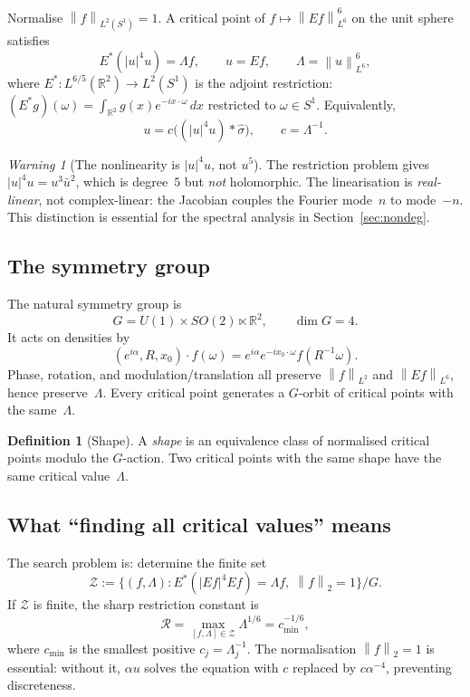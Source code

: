 \documentclass[12pt]{article}
\theoremstyle{definition}
\newtheorem{definition}[theorem]{Definition}
\theoremstyle{remark}
\newtheorem{warning}[theorem]{Warning}
\newcommand{\R}{\mathbb{R}}
\newcommand{\wh}{\widehat}
\newcommand{\norm}[1]{\left\|#1\right\|}
\begin{document}
Normalise $\norm{f}_{L^2(S^1)}=1$.  A critical point of
$f\mapsto\norm{Ef}_{L^6}^6$ on the unit sphere satisfies
\begin{equation}  \label{eq:EL}
  E^*(|u|^4u) = \Lambda f,
  \qquad u=Ef,\qquad \Lambda=\norm{u}_{L^6}^6,
\end{equation}
where $E^*:L^{6/5}(\R^2)\to L^2(S^1)$ is the adjoint restriction:
$(E^*g)(\omega)=\int_{\R^2}g(x)e^{-ix\cdot\omega}\,dx$ restricted to
$\omega\in S^1$.  Equivalently,
\begin{equation}  \label{eq:EL-u}
  u = c\bigl((|u|^4u)\ast\wh\sigma\bigr),
  \qquad c=\Lambda^{-1}.
\end{equation}

\begin{warning}[The nonlinearity is $|u|^4u$, not $u^5$]
  The restriction problem gives $|u|^4u=u^3\bar u^2$, which is
  degree~$5$ but \emph{not} holomorphic.  The linearisation is
  \emph{real-linear}, not complex-linear: the Jacobian couples the Fourier
  mode~$n$ to mode~$-n$.  This distinction is essential for the spectral
  analysis in Section~\ref{sec:nondeg}.
\end{warning}

\subsection{The symmetry group}

The natural symmetry group is
\[
  G = U(1)\times SO(2)\ltimes\R^2,
  \qquad \dim G=4.
\]
It acts on densities by
\[
  (e^{i\alpha},R,x_0)\cdot f(\omega)
  = e^{i\alpha}e^{-ix_0\cdot\omega}f(R^{-1}\omega).
\]
Phase, rotation, and modulation/translation all preserve $\norm{f}_{L^2}$
and $\norm{Ef}_{L^6}$, hence preserve~$\Lambda$.  Every critical point
generates a $G$-orbit of critical points with the same~$\Lambda$.

\begin{definition}[Shape]
  A \emph{shape} is an equivalence class of normalised critical points modulo
  the $G$-action.  Two critical points with the same shape have the same
  critical value~$\Lambda$.
\end{definition}

\subsection{What ``finding all critical values'' means}

The search problem is: determine the finite set
\[
  \mathcal Z
  :=
  \{(f,\Lambda):E^*(|Ef|^4Ef)=\Lambda f,\;\norm{f}_2=1\}/G.
\]
If $\mathcal Z$ is finite, the sharp restriction constant is
\[
  \mathcal R = \max_{[f,\Lambda]\in\mathcal Z}\Lambda^{1/6}
  = c_{\min}^{-1/6},
\]
where $c_{\min}$ is the smallest positive $c_j=\Lambda_j^{-1}$.
The normalisation $\norm{f}_2=1$ is essential: without it, $\alpha u$ solves
the equation with $c$ replaced by $c\alpha^{-4}$, preventing discreteness.
\end{document}
